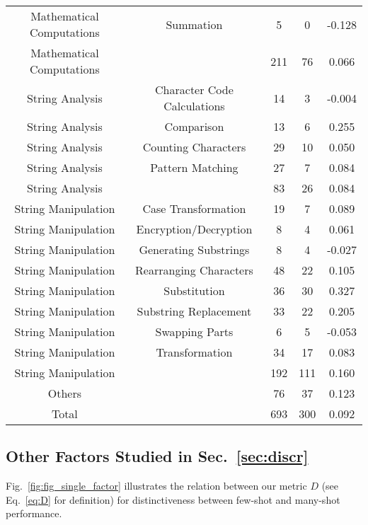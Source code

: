 \begin{table*}[ht]
\begin{tabular}{ccccc}
        Mathematical Computations & Summation &5&0& {\color{red}-0.128}\\
        Mathematical Computations && 211&76& 0.066 \\
        \midrule 
        String Analysis & Character Code Calculations &14&3& -0.004 \\
        String Analysis & Comparison &13&6& {\color{blue}0.255} \\
        String Analysis & 
        Counting Characters &29&10& 0.050 \\
        String Analysis & Pattern Matching &27&7& 0.084 \\
        String Analysis && 83& 26& 0.084\\
        \midrule
        String Manipulation & Case Transformation &19&7& 0.089\\
        String Manipulation & Encryption/Decryption &8&4& 0.061\\
        String Manipulation & Generating Substrings &8&4& -0.027\\
        String Manipulation & Rearranging Characters &48&22& {\color{blue}0.105}\\
        String Manipulation &  Substitution&36&30& {\color{blue}0.327} \\
        String Manipulation & Substring Replacement &33&22&{\color{blue}0.205} \\
        String Manipulation & Swapping Parts &6& 5& -0.053 \\
        String Manipulation & Transformation &34& 17 & 0.083\\
        String Manipulation && 192 & 111 & {\color{blue}0.160}\\
        \midrule
        Others && 76 & 37  & {\color{blue}0.123}\\
        Total && 693 & 300 & 0.092\\
        \bottomrule
    \end{tabular}
    
    \label{tab:problem_type}
\end{table*}

\subsection{Other Factors Studied in Sec.~\ref{sec:discr}}
\label{sec:example_factor}

Fig.~\ref{fig:fig_single_factor} illustrates the relation between our metric $D$ (see Eq.~\eqref{eq:D} for definition) for distinctiveness between few-shot and many-shot performance.

